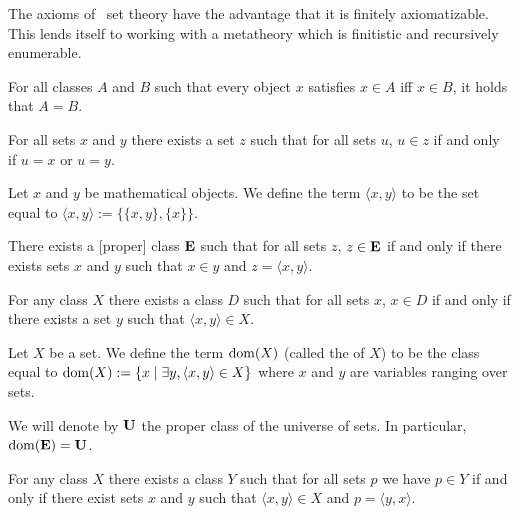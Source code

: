 \begin{node}[Axioms]
The axioms of \NBG\ set theory have the advantage that it is finitely
axiomatizable. This lends itself to working with a metatheory which is
finitistic and recursively enumerable.

\begin{node}
For all classes $A$ and $B$ such that every object $x$ satisfies $x\in A$
iff $x\in B$, it holds that $A=B$.
\end{node}

\begin{node}
For all sets $x$ and $y$ there exists a set $z$ such that for all sets
$u$, $u\in z$ if and only if $u=x$ or $u=y$.
\end{node}

\begin{definition}
Let $x$ and $y$ be mathematical objects. We define the term $\langle x,y\rangle$
to be the set equal to $\langle x,y\rangle := \{\{x,y\}, \{x\}\}$.
\end{definition}

\begin{node}
There exists a [proper] class $\mathbf{E}$ such that for all sets $z$,
$z\in\mathbf{E}$ if and only if there exists sets $x$ and $y$ such
that $x\in y$ and $z=\langle x,y\rangle$.
\end{node}

\begin{node}
For any class $X$ there exists a class $D$ such that for all sets $x$,
$x\in D$ if and only if there exists a set $y$ such that $\langle x,y\rangle\in X$.
\end{node}

\begin{definition}
Let $X$ be a set. We define the term $\operatorname{dom}(X)$ (called the
 of $X$) to be the class equal to
$\operatorname{dom}(X):=\{x\mid\exists y,\langle x,y\rangle\in X\}$ where $x$ and $y$
are variables ranging over sets.
\end{definition}

\M
We will denote by $\mathbf{U}$ the proper class of the universe of sets.
In particular, $\operatorname{dom}(\mathbf{E})=\mathbf{U}$.
\begin{node}
For any class $X$ there exists a class $Y$ such that for all sets $p$ we
have $p\in Y$ if and only if there exist sets $x$ and $y$ such that
$\langle x,y\rangle\in X$ and $p=\langle y,x\rangle$.
\end{node}

\end{node}
